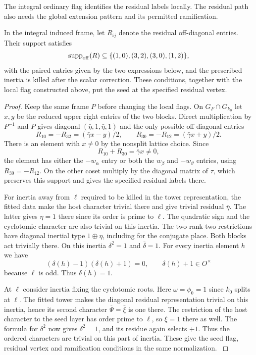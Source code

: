 The integral ordinary flag identifies the residual labels locally. The residual path also needs the global extension pattern and its permitted ramification.

\begin{proposition}\label{prop:count-two-residual-seed-support}
In the integral induced frame, let \(R_{ij}\) denote the residual off-diagonal entries. Their support satisfies 
\[
 \operatorname{supp}_{\rm off}(R)\subseteq\{(1,0),(3,2),(3,0),(1,2)\},
\]
 with the paired entries given by the two expressions below, and the prescribed inertia is killed after the scalar
correction. These conditions, together with the local flag
constructed above, put the seed at the specified residual
vertex.
\end{proposition}

\begin{proof}
Keep the same frame
\(P\) before changing the local flags. On
\(G_F\cap G_{k_0}\) let \(x,y\) be the reduced upper
right entries of the two blocks. Direct multiplication by
\(P^{-1}\) and \(P\) gives diagonal
\((\bar\eta,1,\bar\eta,1)\) and the only possible
off-diagonal entries
\[
 R_{10}=-R_{32}=(\bar\gamma x-y)/2,\qquad
 R_{30}=-R_{12}=(\bar\gamma x+y)/2 .
\]
There is an element with \(x\ne0\) by the nonsplit lattice
choice. Since
\[
                   R_{10}+R_{30}=\bar\gamma x\ne0,
\]
the element has either the \(-w_\alpha\) entry or both the
\(w_\beta\) and \(-w_\vartheta\) entries, using \(R_{30}=-R_{12}\). On the other coset multiply by the
diagonal matrix of \(\tau\), which preserves this support
and gives the specified residual labels there.

For inertia away from \(\ell\) required to be killed in
the tower representation, the fitted data make the host
character trivial there and give trivial residual
\(\bar\eta\). The latter gives \(\eta=1\) there since
its order is prime to \(\ell\). The quadratic sign and the
cyclotomic character are also trivial on this inertia.
The two rank-two restrictions have diagonal inertial type
\(1\oplus\eta\), including for the conjugate place. Both
blocks act trivially there. On this inertia \(\delta^2=1\) and \(\bar\delta=1\). For every inertia element \(h\) we have
\[
 (\delta(h)-1)(\delta(h)+1)=0,\qquad \delta(h)+1\in O^\times
\]
because \(\ell\) is odd. Thus \(\delta(h)=1\).

At
\(\ell\) consider inertia fixing the cyclotomic roots.
Here \(\omega=\phi_0=1\) since \(k_0\) splits at \(\ell\).
The fitted tower makes the diagonal residual representation
trivial on this inertia, hence its second character
\(\overline\Psi=\bar\xi\) is one there. The restriction of
the host character to the seed layer has order prime to
\(\ell\), so \(\xi=1\) there as well. The formula for
\(\delta^2\) now gives \(\delta^2=1\), and its residue
again selects \(+1\). Thus the ordered characters are
trivial on this part of inertia.
These give the seed flag, residual vertex and ramification
conditions in the same normalization.
\label{cor:ordinary-promodularity-10}

\end{proof}

